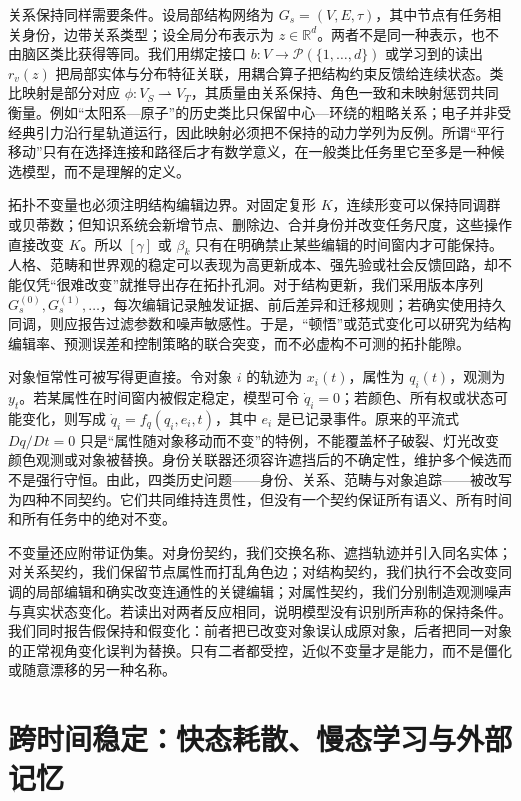 关系保持同样需要条件。设局部结构网络为 $G_s=(V,E,\tau)$，其中节点有任务相关身份，边带关系类型；设全局分布表示为 $z\in\mathbb{R}^{d}$。两者不是同一种表示，也不由脑区类比获得等同。我们用绑定接口 $b:V\rightarrow\mathcal{P}(\{1,\ldots,d\})$ 或学习到的读出 $r_v(z)$ 把局部实体与分布特征关联，用耦合算子把结构约束反馈给连续状态。类比映射是部分对应 $\phi:V_S\rightharpoonup V_T$，其质量由关系保持、角色一致和未映射惩罚共同衡量。例如“太阳系—原子”的历史类比只保留中心—环绕的粗略关系；电子并非受经典引力沿行星轨道运行，因此映射必须把不保持的动力学列为反例。所谓“平行移动”只有在选择连接和路径后才有数学意义，在一般类比任务里它至多是一种候选模型，而不是理解的定义。

拓扑不变量也必须注明结构编辑边界。对固定复形 $K$，连续形变可以保持同调群或贝蒂数；但知识系统会新增节点、删除边、合并身份并改变任务尺度，这些操作直接改变 $K$。所以 $[\gamma]$ 或 $\beta_k$ 只有在明确禁止某些编辑的时间窗内才可能保持。人格、范畴和世界观的稳定可以表现为高更新成本、强先验或社会反馈回路，却不能仅凭“很难改变”就推导出存在拓扑孔洞。对于结构更新，我们采用版本序列 $G_s^{(0)},G_s^{(1)},\ldots$，每次编辑记录触发证据、前后差异和迁移规则；若确实使用持久同调，则应报告过滤参数和噪声敏感性。于是，“顿悟”或范式变化可以研究为结构编辑率、预测误差和控制策略的联合突变，而不必虚构不可测的拓扑能隙。

对象恒常性可被写得更直接。令对象 $i$ 的轨迹为 $x_i(t)$，属性为 $q_i(t)$，观测为 $y_t$。若某属性在时间窗内被假定稳定，模型可令 $\dot q_i=0$；若颜色、所有权或状态可能变化，则写成 $\dot q_i=f_q(q_i,e_i,t)$，其中 $e_i$ 是已记录事件。原来的平流式 $Dq/Dt=0$ 只是“属性随对象移动而不变”的特例，不能覆盖杯子破裂、灯光改变颜色观测或对象被替换。身份关联器还须容许遮挡后的不确定性，维护多个候选而不是强行守恒。由此，四类历史问题——身份、关系、范畴与对象追踪——被改写为四种不同契约。它们共同维持连贯性，但没有一个契约保证所有语义、所有时间和所有任务中的绝对不变。

不变量还应附带证伪集。对身份契约，我们交换名称、遮挡轨迹并引入同名实体；对关系契约，我们保留节点属性而打乱角色边；对结构契约，我们执行不会改变同调的局部编辑和确实改变连通性的关键编辑；对属性契约，我们分别制造观测噪声与真实状态变化。若读出对两者反应相同，说明模型没有识别所声称的保持条件。我们同时报告假保持和假变化：前者把已改变对象误认成原对象，后者把同一对象的正常视角变化误判为替换。只有二者都受控，近似不变量才是能力，而不是僵化或随意漂移的另一种名称。

\section{跨时间稳定：快态耗散、慢态学习与外部记忆}

